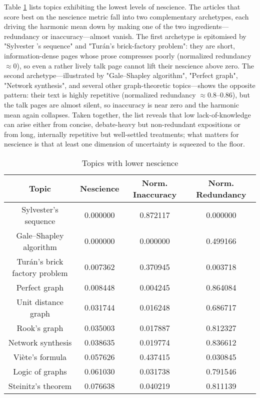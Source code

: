 Table \ref{tab:Lower-nescience-of-topics} lists topics exhibiting the lowest levels of nescience. The articles that score best on the nescience metric fall into two complementary archetypes, each driving the harmonic mean down by making one of the two ingredients—redundancy or inaccuracy—almost vanish.  The first archetype is epitomised by "Sylvester ’s sequence" and "Turán’s brick-factory problem": they are short, information-dense pages whose prose compresses poorly (normalized redundancy $\approx 0$), so even a rather lively talk page cannot lift their nescience above zero.  The second archetype—illustrated by "Gale–Shapley algorithm", "Perfect graph", "Network synthesis", and several other graph-theoretic topics—shows the opposite pattern: their text is highly repetitive (normalized redundancy $\approx 0.8–0.86$), but the talk pages are almost silent, so inaccuracy is near zero and the harmonic mean again collapses.  Taken together, the list reveals that low lack-of-knowledge can arise either from concise, debate-heavy but non-redundant expositions or from long, internally repetitive but well-settled treatments; what matters for nescience is that at least one dimension of uncertainty is squeezed to the floor.

\begin{table}
\begin{centering}
\begin{tabular}{|c|c|c|c|}
\hline 
Topic & Nescience & Norm. Inaccuracy & Norm. Redundancy \tabularnewline
\hline 
\hline
Sylvester's sequence & 0.000000 & 0.872117 & 0.000000 \tabularnewline
\hline
Gale–Shapley algorithm & 0.000000 & 0.000000 & 0.499166 \tabularnewline
\hline
Turán's brick factory problem & 0.007362 & 0.370945 & 0.003718 \tabularnewline
\hline
Perfect graph & 0.008448 & 0.004245 & 0.864084 \tabularnewline
\hline
Unit distance graph & 0.031744 & 0.016248 & 0.686717 \tabularnewline
\hline
Rook's graph & 0.035003 & 0.017887 & 0.812327 \tabularnewline
\hline
Network synthesis & 0.038635 & 0.019774 & 0.836612 \tabularnewline
\hline
Viète's formula & 0.057626 & 0.437415 & 0.030845 \tabularnewline
\hline
Logic of graphs & 0.061030 & 0.031738 & 0.791546 \tabularnewline
\hline
Steinitz's theorem & 0.076638 & 0.040219 & 0.811139 \tabularnewline
\hline 
\end{tabular}
\par\end{centering}
\caption{\label{tab:Lower-nescience-of-topics}Topics with lower nescience}
\end{table}

